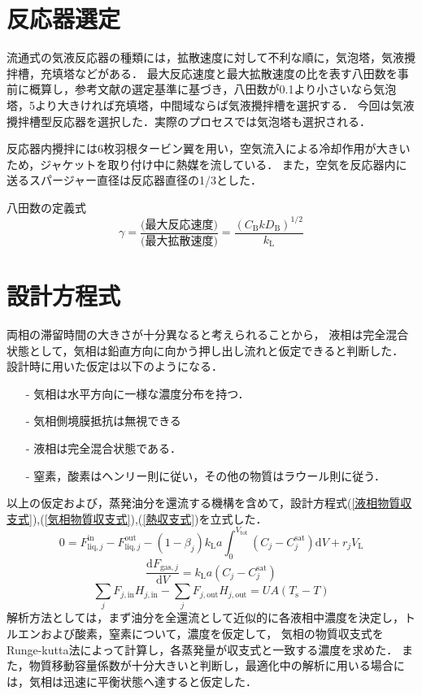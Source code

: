 \documentclass[a4j]{jsreport}
\newcommand{\diff}{\mathrm{d}}
\begin{document}
\section{反応器選定}
流通式の気液反応器の種類には，拡散速度に対して不利な順に，気泡塔，気液攪拌槽，充填塔などがある．
最大反応速度と最大拡散速度の比を表す八田数を事前に概算し，参考文献\cite{化工便覧}の選定基準に基づき，八田数が0.1より小さいなら気泡塔，5より大きければ充填塔，中間域ならば気液攪拌槽を選択する．
今回は気液攪拌槽型反応器を選択した．実際のプロセスでは気泡塔も選択される．
\par
反応器内攪拌には6枚羽根タービン翼を用い，空気流入による冷却作用が大きいため，ジャケットを取り付け中に熱媒を流している．
また，空気を反応器内に送るスパージャー直径は反応器直径の1/3とした．\\
\par
八田数の定義式
\begin{equation}
    \gamma = \frac{\text{(最大反応速度)}}{\text{(最大拡散速度)}} = \frac{(C_\mathrm{B}kD_\mathrm{B})^{1/2}} {k_\mathrm{L}}
\end{equation}

\section{設計方程式}
両相の滞留時間の大きさが十分異なると考えられることから，
液相は完全混合状態として，気相は鉛直方向に向かう押し出し流れと仮定できると判断した．
設計時に用いた仮定は以下のようになる．
\begin{itemize}
    \item[-] 気相は水平方向に一様な濃度分布を持つ．
    \item[-] 気相側境膜抵抗は無視できる
    \item[-] 液相は完全混合状態である．
    \item[-] 窒素，酸素はヘンリー則に従い，その他の物質はラウール則に従う．
\end{itemize}
以上の仮定および，蒸発油分を還流する機構を含めて，設計方程式(\ref{液相物質収支式}),(\ref{気相物質収支式}),(\ref{熱収支式})を立式した．\\
\begin{equation}
    \label{液相物質収支式}
    0 = F^\text{in}_{\text{liq},j} - F^\text{out}_{\text{liq},j} - (1-\beta_j) k_\mathrm{L}a
    \int^{V_\text{tot}}_0(C_j - C^\text{sat}_j) \diff V + r_j V_\mathrm{L}
\end{equation}
\begin{equation}
    \label{気相物質収支式}
    \frac{ \diff F_{\text{gas},j}}{\diff V} = k_\mathrm{L}a (C_j - C^\text{sat}_j)
\end{equation}
\begin{equation}
    \label{熱収支式}
    \sum_jF_{j,\mathrm{in}}H_{j,\mathrm{in}}-\sum_jF_{j,\text{out}}H_{j,\text{out}} = UA(T_\mathrm{s}-T)
\end{equation}
解析方法としては，まず油分を全還流として近似的に各液相中濃度を決定し，トルエンおよび酸素，窒素について，濃度を仮定して，
気相の物質収支式をRunge-kutta法によって計算し，各蒸発量が収支式と一致する濃度を求めた．
また，物質移動容量係数が十分大きいと判断し，最適化中の解析に用いる場合には，気相は迅速に平衡状態へ達すると仮定した．
\end{document}
